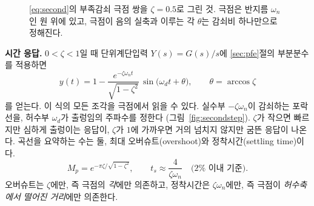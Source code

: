 \documentclass[11pt]{article}
\begin{document}
\begin{figure}[htb]
\centering
{}
\caption{\eqref{eq:second}의 부족감쇠 극점 쌍을 $\zeta=0.5$로 그린 것. 극점은
반지름 $\omega_n$인 원 위에 있고, 극점이 음의 실축과 이루는 각 $\theta$는 감쇠비
하나만으로 정해진다.}
\label{fig:secondpoles}
\end{figure}

\smallskip\noindent\textbf{시간 응답.} $0<\zeta<1$일 때 단위계단입력
$Y(s)=G(s)/s$에 \ref{sec:pfe}절의 부분분수를 적용하면
\begin{equation}\label{eq:secondstep}
   y(t) = 1 - \frac{e^{-\zeta\omega_n t}}{\sqrt{1-\zeta^{2}}}\,
          \sin\bigl(\omega_d t+\theta\bigr),
   \qquad \theta=\arccos\zeta
\end{equation}
를 얻는다. 이 식의 모든 조각을 극점에서 읽을 수 있다. 실수부 $-\zeta\omega_n$이
감쇠하는 포락선을, 허수부 $\omega_d$가 출렁임의 주파수를 정한다
(그림~\ref{fig:secondstep}). $\zeta$가 작으면 빠르지만 심하게 출렁이는 응답이,
$\zeta$가 $1$에 가까우면 거의 넘치지 않지만 굼뜬 응답이 나온다. 곡선을 요약하는
수는 둘, 최대 오버슈트(overshoot)와 정착시간(settling time)이다.
\begin{equation}\label{eq:overshoot}
   M_p = e^{-\pi\zeta/\sqrt{1-\zeta^{2}}},
   \qquad
   t_s \approx \frac{4}{\zeta\omega_n}\quad\text{($2\%$ 이내 기준)} .
\end{equation}
오버슈트는 $\zeta$에만, 즉 극점의 \emph{각}에만 의존하고, 정착시간은
$\zeta\omega_n$에만, 즉 극점이 \emph{허수축에서 떨어진 거리}에만 의존한다.
\end{document}
